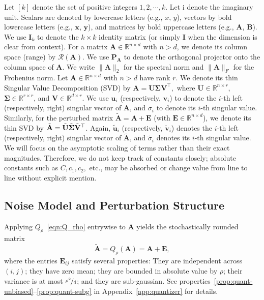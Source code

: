 \documentclass{article}
\newcommand{\twonorm}[1]{\|#1\|_2}
\newcommand{\eb}{\mathbf{e}}
\newcommand{\ub}{\mathbf{u}}
\newcommand{\vb}{\mathbf{v}}
\newcommand{\xb}{\mathbf{x}}
\newcommand{\yb}{\mathbf{y}}
\newcommand{\ubtil}{\tilde{\ub}}
\newcommand{\vbtil}{\tilde{\vb}}
\newcommand{\Ab}{\mathbf{A}}
\newcommand{\Bb}{\mathbf{B}}
\newcommand{\Eb}{\mathbf{E}}
\newcommand{\Ib}{\mathbf{I}}
\newcommand{\Pb}{\mathbf{P}}
\newcommand{\Ub}{\mathbf{U}}
\newcommand{\Vb}{\mathbf{V}}
\newcommand{\Abtil}{\tilde{\Ab}}
\newcommand{\Ubtil}{\tilde{\Ub}}
\newcommand{\Vbtil}{\tilde{\Vb}}
\newcommand{\Sigmab}{\mathbf{\Sigma}}
\begin{document}
Let $[k]$ denote the set of positive integers ${1, 2, \cdots, k}$. Let $\mathrm{i}$ denote the imaginary unit. Scalars are denoted by lowercase letters (e.g., $x$, $y$), vectors by bold lowercase letters (e.g., $\xb$, $\yb$), and matrices by bold uppercase letters (e.g., $\Ab$, $\Bb$). We use $\Ib_k$ to denote the $k \times k$ identity matrix (or simply $\Ib$ when the dimension is clear from context). For a matrix $\Ab \in \mathbb{R}^{n \times d}$ with $n > d$, we denote its column space (range) by $\mathcal{R}(\Ab)$. We use $\Pb_{\Ab}$ to denote the orthogonal projector onto the column space of $\Ab$. We write $\twonorm{\Ab}$ for the spectral norm and $\|\Ab\|_F$ for the Frobenius norm.
Let $\Ab \in \mathbb{R}^{n \times d}$ with $n>d$ have rank $r$. We denote its thin Singular Value Decomposition (SVD) by
%
$\Ab = \Ub \Sigmab \Vb^\top,$
%
where $\Ub \in \mathbb{R}^{n \times r}$, $\Sigmab \in \mathbb{R}^{r \times r}$, and $\Vb \in \mathbb{R}^{d \times r}$. We use $\ub_i$ (respectively, $\vb_i$) to denote the $i$-th left (respectively, right) singular vector of $\Ab$, and $\sigma_i$ to denote its $i$-th singular value. Similarly, for the perturbed matrix
%
$\Abtil = \Ab + \Eb$
%
(with $\Eb \in \mathbb{R}^{n \times d}$), we denote its thin SVD by $\Abtil = \Ubtil \Tilde{\Sigmab} \Vbtil^\top$. Again, $\ubtil_i$ (respectively, $\vbtil_i$) denotes the $i$-th left (respectively, right) singular vector of $\Abtil$, and $\tilde{\sigma}_i$ denotes its $i$-th singular value. We will focus on the asymptotic scaling of terms rather than their exact magnitudes. Therefore, we do not keep track of constants closely; absolute constants such as $C, c_1, c_2,$ etc., may be absorbed or change value from line to line without explicit mention.  



\subsection{Noise Model and Perturbation Structure}\label{noise-model}
Applying $Q_{\rho}$~\eqref{eqn:Q_rho} entrywise to $\Ab$ yields the stochastically rounded matrix
\begin{equation}
    \Abtil = Q_{\rho} (\Ab) = \Ab + \Eb,
    \label{eq:SR-model}
\end{equation}
%
where the entries $\Eb_{ij}$ satisfy several properties: They are independent across $(i,j)$; they have zero mean; they are bounded in absolute value by $\rho$; their variance is at most $\nicefrac{\rho^2}{4}$; and they are sub-gaussian. See properties~\eqref{prop:quant-unbiased}--\eqref{prop:quant-subg} in Appendix~\ref{app:quantizer} for details.
\end{document}
